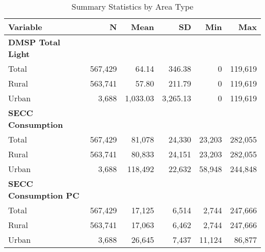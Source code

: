\begin{table}[h]
    \centering
    \renewcommand{\arraystretch}{1.2}
    \setlength{\tabcolsep}{8pt}
    \begin{tabular}{lrrrrr}
        \toprule\toprule
        \textbf{Variable} & \textbf{N} & \textbf{Mean} & \textbf{SD} & \textbf{Min} & \textbf{Max} \\
        \midrule
        \textbf{DMSP Total Light} \\
        \hspace{5mm} Total  & 567,429 & 64.14  & 346.38  & 0        & 119,619 \\
        \hspace{5mm} Rural  & 563,741 & 57.80  & 211.79  & 0        & 119,619 \\
        \hspace{5mm} Urban  & 3,688   & 1,033.03 & 3,265.13 & 0        & 119,619 \\
        \midrule
        \textbf{SECC Consumption} \\
        \hspace{5mm} Total  & 567,429 & 81,078 & 24,330 & 23,203 & 282,055 \\
        \hspace{5mm} Rural  & 563,741 & 80,833 & 24,151 & 23,203 & 282,055 \\
        \hspace{5mm} Urban  & 3,688   & 118,492 & 22,632 & 58,948 & 244,848 \\
        \midrule
        \textbf{SECC Consumption PC} \\
        \hspace{5mm} Total  & 567,429 & 17,125 & 6,514  & 2,744  & 247,666 \\
        \hspace{5mm} Rural  & 563,741 & 17,063 & 6,462  & 2,744  & 247,666 \\
        \hspace{5mm} Urban  & 3,688   & 26,645 & 7,437  & 11,124 & 86,877 \\
        \toprule\toprule
    \end{tabular}
    \caption{Summary Statistics by Area Type}
    \label{tab:summary_stats}
\end{table}
